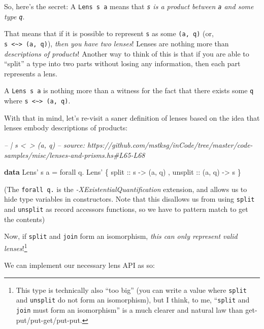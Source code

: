 \documentclass[]{article}
\newenvironment{Shaded}{}{}
\newcommand{\CommentTok}[1]{\textcolor[rgb]{0.38,0.63,0.69}{\textit{#1}}}
\newcommand{\DataTypeTok}[1]{\textcolor[rgb]{0.56,0.13,0.00}{#1}}
\newcommand{\FunctionTok}[1]{\textcolor[rgb]{0.02,0.16,0.49}{#1}}
\newcommand{\KeywordTok}[1]{\textcolor[rgb]{0.00,0.44,0.13}{\textbf{#1}}}
\newcommand{\NormalTok}[1]{#1}
\newcommand{\OtherTok}[1]{\textcolor[rgb]{0.00,0.44,0.13}{#1}}
\begin{document}
So, here's the secret: A \texttt{Lens\textquotesingle{}\ s\ a} means that
\emph{\texttt{s} is a product between \texttt{a} and some type \texttt{q}}.

That means that if it is possible to represent \texttt{s} as some
\texttt{(a,\ q)} (or,
\texttt{s\ \textless{}\textasciitilde{}\textgreater{}\ (a,\ q)}), \emph{then you
have two lenses}! Lenses are nothing more than \emph{descriptions of products}!
Another way to think of this is that if you are able to ``split'' a type into
two parts without losing any information, then each part represents a lens.

A \texttt{Lens\textquotesingle{}\ s\ a} is nothing more than a witness for the
fact that there exists some \texttt{q} where
\texttt{s\ \textless{}\textasciitilde{}\textgreater{}\ (a,\ q)}.

With that in mind, let's re-visit a saner definition of lenses based on the idea
that lenses embody descriptions of products:

\begin{Shaded}
\begin{Highlighting}[]
\CommentTok{-- | s <~> (a, q)}
\CommentTok{-- source: https://github.com/mstksg/inCode/tree/master/code-samples/misc/lenses-and-prisms.hs#L65-L68}

\KeywordTok{data} \DataTypeTok{Lens'}\NormalTok{ s a }\FunctionTok{=}\NormalTok{ forall q}\FunctionTok{.} \DataTypeTok{Lens'}
\NormalTok{    \{}\OtherTok{ split   ::}\NormalTok{ s }\OtherTok{->}\NormalTok{ (a, q)}
\NormalTok{    ,}\OtherTok{ unsplit ::}\NormalTok{ (a, q) }\OtherTok{->}\NormalTok{ s}
\NormalTok{    \}}
\end{Highlighting}
\end{Shaded}

(The \texttt{forall\ q.} is the \emph{-XExistentialQuantification} extension,
and allows us to hide type variables in constructors. Note that this disallows
us from using \texttt{split} and \texttt{unsplit} as record accessors functions,
so we have to pattern match to get the contents)

Now, if \texttt{split} and \texttt{join} form an isomorphism, \emph{this can
only represent valid lenses}!\footnote{This type is technically also ``too big''
  (you can write a value where \texttt{split} and \texttt{unsplit} do not form
  an isomorphism), but I think, to me, ``\texttt{split} and \texttt{join} must
  form an isomorphism'' is a much clearer and natural law than
  get-put/put-get/put-put.}

We can implement our necessary lens API as so:
\end{document}
